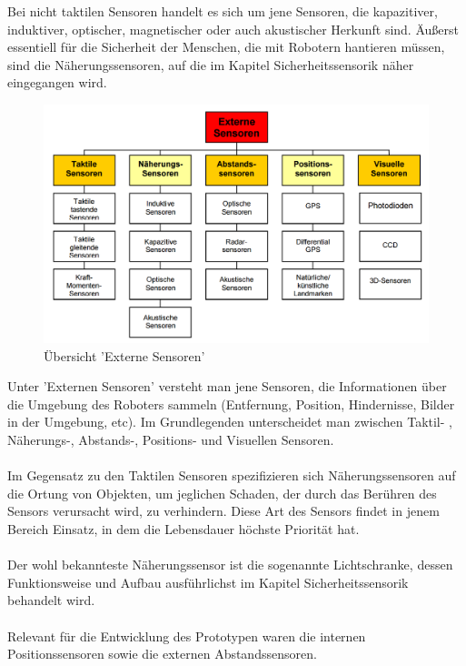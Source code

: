 \documentclass[11pt, a4paper]{article}
\begin{document}
Bei nicht taktilen Sensoren handelt es sich um jene Sensoren, die kapazitiver, induktiver, optischer, magnetischer oder auch akustischer Herkunft sind.{\cite{taktil-nicht-taktil}} \"Au\ss{}erst essentiell f\"ur die Sicherheit der Menschen, die mit Robotern hantieren m\"ussen, sind die N\"aherungssensoren, auf die im Kapitel Sicherheitssensorik n\"aher eingegangen wird.
\newpage
\begin{figure}[h!]
		\centering
		\includegraphics[width=1.0\textwidth]{graphics/sensors/externe-sensoren}
		\caption{\"Ubersicht 'Externe Sensoren'{\cite{robot-sensors}}}
\end{figure}
\noindent Unter 'Externen Sensoren' versteht man jene Sensoren, die Informationen \"uber die Umgebung des Roboters sammeln (Entfernung, Position, Hindernisse, Bilder in der Umgebung, etc).
Im Grundlegenden unterscheidet man zwischen Taktil- , N\"aherungs-, Abstands-, Positions- und
Visuellen Sensoren. \\ \\
Im Gegensatz zu den Taktilen Sensoren spezifizieren sich N\"aherungssensoren auf die Ortung von Objekten, um jeglichen Schaden, der durch das Ber\"uhren des Sensors verursacht wird, zu verhindern. Diese Art des Sensors findet in jenem Bereich Einsatz, in dem die Lebensdauer h\"ochste Priorit\"at hat. \\ \\
Der wohl bekannteste N\"aherungssensor ist die sogenannte Lichtschranke, dessen Funktionsweise und Aufbau ausf\"uhrlichst im Kapitel Sicherheitssensorik behandelt wird. \\ \\
Relevant f\"ur die Entwicklung des Prototypen waren die internen Positionssensoren sowie die
externen Abstandssensoren.
\newpage
\end{document}
